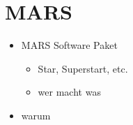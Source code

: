 \section{MARS}%
\label{sec:mars}

\begin{itemize}
  \item MARS Software Paket
    \begin{itemize}
      \item Star, Superstart, etc.
      \item wer macht was
    \end{itemize}
  \item warum
\end{itemize}

